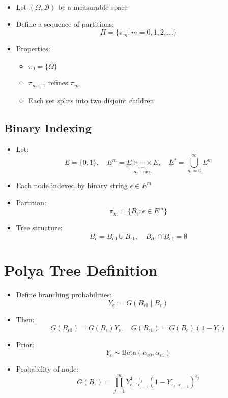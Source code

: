 \documentclass[12pt,oneside]{book}
\numberwithin{equation}{section}
\theoremstyle{definition}
\theoremstyle{plain}
\theoremstyle{remark}
\begin{document}
\begin{itemize}
\item Let $(\Omega, \mathcal{B})$ be a measurable space

\item Define a sequence of partitions:
\[
\Pi = \{\pi_m : m = 0,1,2,\dots\}
\]

\item Properties:
\begin{itemize}
\item $\pi_0 = \{\Omega\}$
\item $\pi_{m+1}$ refines $\pi_m$
\item Each set splits into two disjoint children
\end{itemize}
\end{itemize}

\subsection{Binary Indexing}

\begin{itemize}
\item Let:
\[
E = \{0,1\}, \quad E^m = \underbrace{E \times \cdots \times E}_{m\text{ times}}, \quad E^* = \bigcup_{m=0}^\infty E^m
\]

\item Each node indexed by binary string $\epsilon \in E^m$

\item Partition:
\[
\pi_m = \{ B_\epsilon : \epsilon \in E^m \}
\]

\item Tree structure:
\[
B_\epsilon = B_{\epsilon 0} \cup B_{\epsilon 1}, \quad B_{\epsilon 0} \cap B_{\epsilon 1} = \emptyset
\]
\end{itemize}

\section{Polya Tree Definition}

\begin{itemize}
\item Define branching probabilities:
\[
Y_\epsilon := G(B_{\epsilon 0} \mid B_\epsilon)
\]

\item Then:
\[
G(B_{\epsilon 0}) = G(B_\epsilon) Y_\epsilon, \quad
G(B_{\epsilon 1}) = G(B_\epsilon)(1 - Y_\epsilon)
\]

\item Prior:
\[
Y_\epsilon \sim \text{Beta}(\alpha_{\epsilon 0}, \alpha_{\epsilon 1})
\]

\item Probability of node:
\[
G(B_\epsilon) = \prod_{j=1}^m
Y_{\epsilon_1\cdots\epsilon_{j-1}}^{1-\epsilon_j}
(1 - Y_{\epsilon_1\cdots\epsilon_{j-1}})^{\epsilon_j}
\]
\end{itemize}
\end{document}
